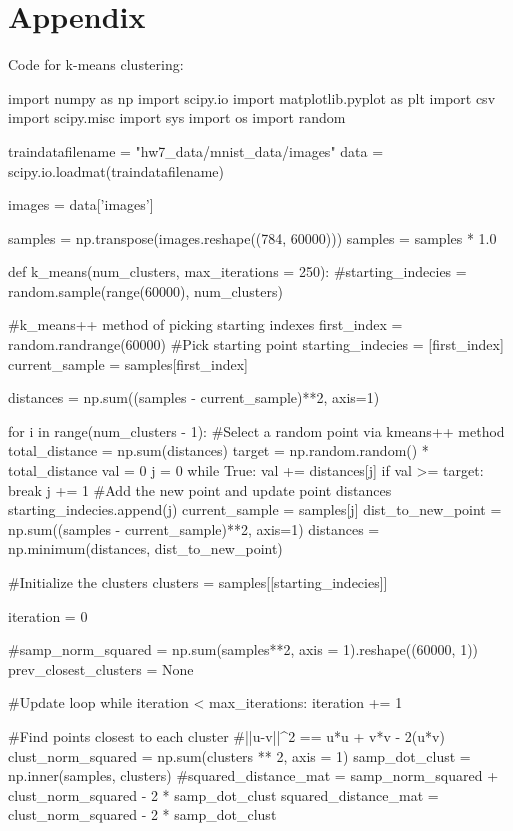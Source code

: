 \documentclass{article}
\begin{document}
\section*{Appendix}
Code for k-means clustering:
\begin{python}
import numpy as np
import scipy.io
import matplotlib.pyplot as plt
import csv
import scipy.misc
import sys
import os
import random

traindatafilename = "hw7_data/mnist_data/images"
data = scipy.io.loadmat(traindatafilename)

images = data['images']

samples = np.transpose(images.reshape((784, 60000)))
samples = samples * 1.0

def k_means(num_clusters, max_iterations = 250):
    #starting_indecies = random.sample(range(60000), num_clusters)

    #k_means++ method of picking starting indexes
    first_index = random.randrange(60000) #Pick starting point
    starting_indecies = [first_index]
    current_sample = samples[first_index]

    distances = np.sum((samples - current_sample)**2, axis=1)

    for i in range(num_clusters - 1):
        #Select a random point via kmeans++ method
        total_distance = np.sum(distances)
        target = np.random.random() * total_distance
        val = 0
        j = 0
        while True:
            val += distances[j]
            if val >= target:
                break
            j += 1
        #Add the new point and update point distances
        starting_indecies.append(j)
        current_sample = samples[j]
        dist_to_new_point = np.sum((samples - current_sample)**2, axis=1)
        distances = np.minimum(distances, dist_to_new_point)

    #Initialize the clusters
    clusters = samples[[starting_indecies]]

    iteration = 0

    #samp_norm_squared = np.sum(samples**2, axis = 1).reshape((60000, 1))
    prev_closest_clusters = None

    #Update loop
    while iteration < max_iterations:
        iteration += 1

        #Find points closest to each cluster
        #||u-v||^2 == u*u + v*v - 2(u*v)
        clust_norm_squared = np.sum(clusters ** 2, axis = 1)
        samp_dot_clust = np.inner(samples, clusters)
        #squared_distance_mat = samp_norm_squared + clust_norm_squared - 2 * samp_dot_clust
        squared_distance_mat = clust_norm_squared - 2 * samp_dot_clust


\end{python}
\end{document}
